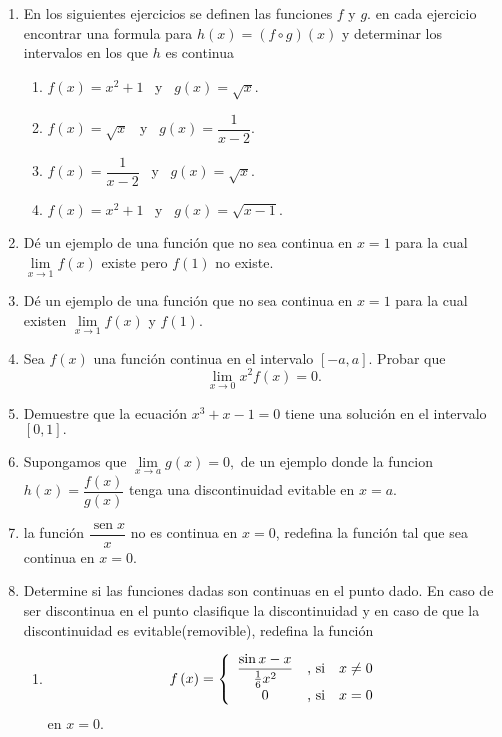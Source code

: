 \begin{enumerate}
\item En los siguientes ejercicios se definen las funciones $f$ y $g$. en cada
ejercicio encontrar una formula para $h(x)=\left(  f\circ g\right)  (x)$ y
determinar los intervalos en los que $h$ es continua

\begin{enumerate}
\item $f(x)=x^{2}+1$ \ y \ $g(x)=\sqrt{x}.$

\item $f(x)=\sqrt{x}$ \ y \ $g(x)=\dfrac{1}{x-2}.$

\item $f(x)=\dfrac{1}{x-2}$ \ y \ $g(x)=\sqrt{x}.$

\item $f(x)=x^{2}+1$ \ y \ $g(x)=\sqrt{x-1}.$
\end{enumerate}

\item D\'{e} un ejemplo de una funci\'{o}n que no sea continua en $x=1$ para
la cual $\lim\limits_{x\rightarrow1}f(x)$ existe pero $f(1)$ no existe.

\item D\'{e} un ejemplo de una funci\'{o}n que no sea continua en $x=1$ para
la cual existen $\lim\limits_{x\rightarrow1}f(x)$ y $f(1).$

\item Sea $f\left(  x\right)  $ una funci\'{o}n continua en el intervalo
$[-a,a]$. Probar que
\[
\lim_{x\rightarrow0}x^{2}f\left(  x\right)  =0.
\]


\item Demuestre que la ecuaci\'{o}n $x^{3}+x-1=0$ tiene una soluci\'{o}n en el
intervalo $[0,1].$

\item Supongamos que $\lim\limits_{x\rightarrow a}g(x)=0,$ de un ejemplo donde
la funcion $h(x)=\dfrac{f(x)}{g(x)}$ tenga una discontinuidad evitable en
$x=a.$

\item la funci\'{o}n $\dfrac{\operatorname{sen}x}{x}$ no es continua en $x=0$,
redefina la funci\'{o}n tal que sea continua en $x=0.$

\item Determine si las funciones dadas son continuas en el punto dado. En caso
de ser discontinua en el punto clasifique la discontinuidad y en caso de que
la discontinuidad es evitable(removible), redefina la funci\'{o}n

\begin{enumerate}
\item
\[
f\left(  x\right)  =\left\{
\begin{array}
[c]{ccc}%
\dfrac{\sin x-x}{\frac{1}{6}x^{2}} & \text{, si} & x\neq0\\
0 & \text{, si} & x=0
\end{array}
\right.
\]
en $x=0.$


\end{enumerate}
\end{enumerate}
